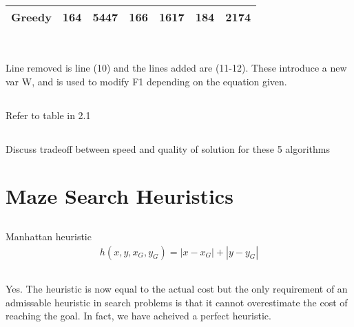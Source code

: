 \documentclass[12pt]{article}
\begin{document}
\begin{table}[h]
\begin{tabular}{|l|l|l|l|l|l|l|}
Greedy                                                  & 164                                                   & 5447                                                            & 166                                                   & 1617                                                          & 184                                                   & 2174                                                              \\ \hline
\end{tabular}
\end{table}

\subsection{}

\\
Line removed is line (10) and the lines added are (11-12). These introduce a new var W, and is used to modify F1 depending on the equation given.\\

\subsection{}
Refer to table in 2.1

\subsection{}
Discuss tradeoff between speed and quality of solution for these 5 algorithms

\section{Maze Search Heuristics}
\subsection{}
Manhattan heuristic
\begin{gather*}
  h(x,y,x_G,y_G)= |x-x_G| + |y-y_G|
\end{gather*}

\subsection{}
\subsubsection{}
Yes. The heuristic is now equal to the actual cost but the only requirement of an admissable heuristic in search problems is that it cannot overestimate the cost of reaching the goal. In fact, we have acheived a perfect heuristic.
\end{document}

